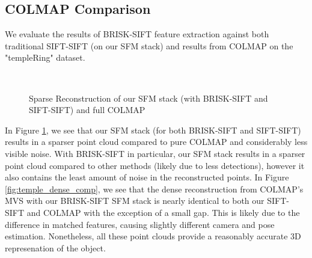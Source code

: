 \documentclass[conference,compsoc]{IEEEtran}
\begin{document}
\subsection{COLMAP Comparison}
We evaluate the results of BRISK-SIFT feature extraction against both 
traditional SIFT-SIFT (on our SFM stack) and results from COLMAP on 
the "templeRing" \cite{temple} dataset. 
\begin{figure}[ht!]
    \centering
    \ \ \ 
    \\
    \caption{Sparse Reconstruction of our SFM stack (with BRISK-SIFT and SIFT-SIFT) and full COLMAP}
    \label{fig:temple_sparse_comp}
\end{figure}
In Figure \ref{fig:temple_sparse_comp}, we see that our SFM stack (for both
BRISK-SIFT and SIFT-SIFT) results in a sparser point cloud compared to 
pure COLMAP and considerably less visible noise. 
With BRISK-SIFT in particular, our SFM stack results in a sparser point cloud
compared to other methods (likely due to less detections), however it also 
contains the least amount of noise in the reconstructed points. In 
Figure \ref{fig:temple_dense_comp}, we see that the dense reconstruction from 
COLMAP's MVS \cite{schoenberger2016mvs} with our BRISK-SIFT SFM stack is nearly identical to both 
our SIFT-SIFT and COLMAP with the exception of a small gap. This is likely due to 
the difference in matched features, causing slightly different camera and pose estimation.
Nonetheless, all these point clouds provide a reasonably accurate 3D represenation
of the object. 
\end{document}
